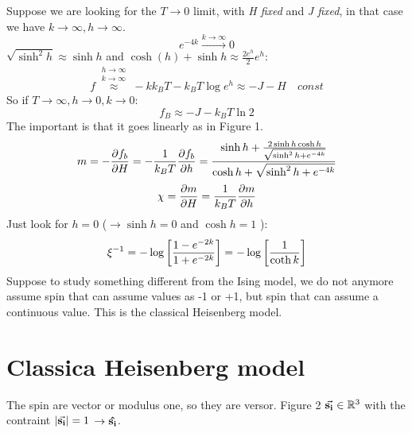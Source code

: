 \documentclass[../main/main.tex]{subfiles}
\begin{document}
Suppose we are looking for the \( T \rightarrow 0 \) limit, with \emph{H fixed} and \emph{J fixed}, in that case we have
\( k \rightarrow \infty , h \rightarrow \infty  \).
\begin{equation}
  e^{-4k} \overset{k \rightarrow \infty }{\longrightarrow} 0
\end{equation}
\( \sqrt{\sinh^2 h } \approx \sinh h  \) and \( \cosh(h) + \sinh h \approx \frac{2 e^{h} }{2} e^{h}  \):
\begin{equation}
  f \overset{\substack{h \rightarrow \infty  \\ k \rightarrow \infty  } }{\approx } - k k_B T - k_B T \log{e^{h} } \approx -J -H \quad const
\end{equation}
So if \( T \rightarrow \infty, h \rightarrow 0, k \rightarrow 0  \):
\begin{equation}
  f_B \approx -J -k_B T \ln{2}
\end{equation}
The important is that it goes linearly as in Figure 1.
\begin{equation}
  m = - \pdv{f_b}{H} = - \frac{1}{k_B T } \pdv{f_b}{h} = \frac{\sinh h + \frac{2 \sinh h \cosh h}{\sqrt{\sinh^2 h + e^{-4k} }} }{\cosh h + \sqrt{\sinh^2 h + e^{-4k} } }
\end{equation}
\begin{equation}
  \chi  = \pdv{m}{H} = \frac{1}{k_B T} \pdv{m}{h}
\end{equation}
Just look for \( h=0 \) (\( \rightarrow \sinh h = 0 \)  and \( \cosh h = 1 \) ):
\begin{equation}
  \xi ^{-1} = - \log{\qty[\frac{1- e^{-2k} }{1+ e^{-2k} }] } =  - \log{\qty[\frac{1 }{\coth k }] }
\end{equation}
Suppose to study something different from the Ising model, we do not anymore assume spin that can assume values as -1 or +1, but spin that can assume a continuous value. This is the classical Heisenberg model.
\section{Classica Heisenberg model}
The spin are vector or modulus one, so they are versor.
Figure 2
\( \va{s_i} \in \mathbb{R}^3 \)  with the contraint \( \abs{\va{s_i}}  = 1\) \(   \rightarrow \vu{s_i} \).
\end{document}
